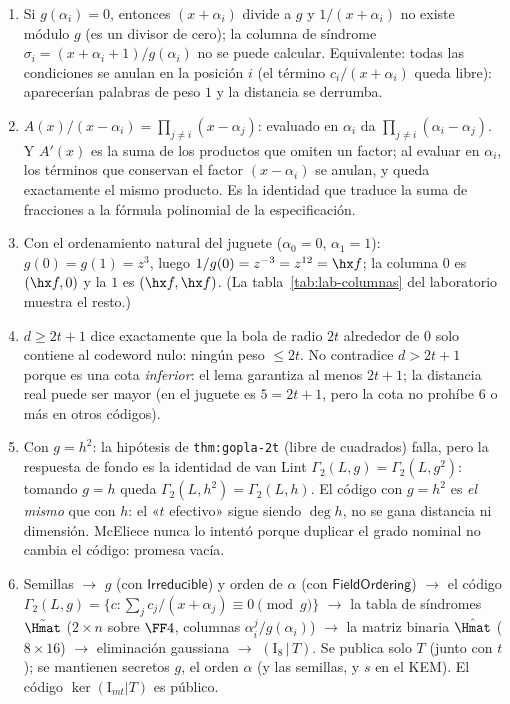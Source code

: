 \begin{enumerate}[leftmargin=1.9em,itemsep=4pt]
  \item Si $g(\alpha_i)=0$, entonces $(x+\alpha_i)$ divide a $g$ y
        $1/(x+\alpha_i)$ no existe módulo $g$ (es un divisor de
        cero); la columna de síndrome
        $\sigma_i=(x+\alpha_i+1)/g(\alpha_i)$ no se puede calcular.
        Equivalente: todas las condiciones se anulan en la posición
        $i$ (el término $c_i/(x+\alpha_i)$ queda libre): aparecerían
        palabras de peso $1$ y la distancia se derrumba.
  \item $A(x)/(x-\alpha_i)=\prod_{j\neq i}(x-\alpha_j)$: evaluado
        en $\alpha_i$ da $\prod_{j\neq i}(\alpha_i-\alpha_j)$. Y
        $A'(x)$ es la suma de los productos que omiten un factor;
        al evaluar en $\alpha_i$, los términos que conservan el
        factor $(x-\alpha_i)$ se anulan, y queda exactamente el
        mismo producto. Es la identidad que traduce la suma de
        fracciones a la fórmula polinomial de la especificación.
  \item Con el ordenamiento natural del juguete ($\alpha_0=0$,
        $\alpha_1=1$): $g(0)=g(1)=z^3$, luego
        $1/g(0)=z^{-3}=z^{12}=\hx f$; la columna $0$ es
        $(\hx f,0)$ y la $1$ es $(\hx f,\hx f)$. (La
        tabla~\ref{tab:lab-columnas} del laboratorio muestra el
        resto.)
  \item $d\ge2t+1$ dice exactamente que la bola de radio $2t$
        alrededor de $0$ solo contiene al codeword nulo: ningún peso
        $\le2t$. No contradice $d>2t+1$ porque es una cota
        \emph{inferior}: el lema garantiza al menos $2t+1$; la
        distancia real puede ser mayor (en el juguete es $5=2t+1$,
        pero la cota no prohíbe $6$ o más en otros códigos).
  \item Con $g=h^2$: la hipótesis de
        \texttt{thm:gopla-2t} (libre de cuadrados) falla, pero la
        respuesta de fondo es la identidad de van Lint
        $\Gamma_2(L,g)=\Gamma_2(L,g^2)$: tomando $g=h$ queda
        $\Gamma_2(L,h^2)=\Gamma_2(L,h)$. El código con $g=h^2$ es
        \emph{el mismo} que con $h$: el «$t$ efectivo» sigue siendo
        $\deg h$, no se gana distancia ni dimensión. McEliece nunca
        lo intentó porque duplicar el grado nominal no cambia el
        código: promesa vacía.
  \item Semillas $\to$ $g$ (con $\textsf{Irreducible}$) y orden de
        $\alpha$ (con $\textsf{FieldOrdering}$) $\to$ el código
        $\Gamma_2(L,g)=\{c:\sum_j c_j/(x+\alpha_j)\equiv0\pmod g\}$
        $\to$ la tabla de síndromes $\tilde{\Hmat}$ ($2\times n$
        sobre $\FF4$, columnas $\alpha_i^j/g(\alpha_i)$) $\to$ la
        matriz binaria $\hat{\Hmat}$ ($8\times16$) $\to$
        eliminación gaussiana $\to$ $(\mathrm{I}_8\,|\,T)$. Se
        publica solo $T$ (junto con $t$); se mantienen secretos $g$,
        el orden $\alpha$ (y las semillas, y $s$ en el KEM). El
        código $\ker(\mathrm{I}_{mt}|T)$ es público.
\end{enumerate}

